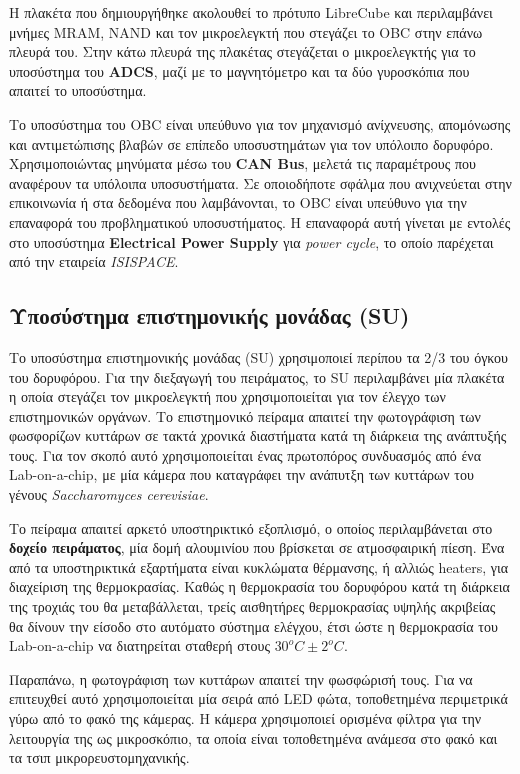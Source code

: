 \documentclass[a4paper,nobib,justified]{tufte-book}
\begin{document}
Η πλακέτα που δημιουργήθηκε ακολουθεί το πρότυπο LibreCube και περιλαμβάνει μνήμες MRAM, NAND και τον μικροελεγκτή που στεγάζει το OBC στην επάνω πλευρά του. Στην κάτω πλευρά της πλακέτας στεγάζεται ο μικροελεγκτής για το υποσύστημα του \textbf{ADCS}, μαζί με το μαγνητόμετρο και τα δύο γυροσκόπια που απαιτεί το υποσύστημα.

Το υποσύστημα του OBC είναι υπεύθυνο για τον μηχανισμό ανίχνευσης, απομόνωσης και αντιμετώπισης βλαβών σε επίπεδο υποσυστημάτων για τον υπόλοιπο δορυφόρο. Χρησιμοποιώντας μηνύματα μέσω του \textbf{CAN Bus}, μελετά τις παραμέτρους που αναφέρουν τα υπόλοιπα υποσυστήματα. Σε οποιοδήποτε σφάλμα που ανιχνεύεται στην επικοινωνία ή στα δεδομένα που λαμβάνονται, το OBC είναι υπεύθυνο για την επαναφορά του προβληματικού υποσυστήματος. Η επαναφορά αυτή γίνεται με εντολές στο υποσύστημα \textbf{Electrical Power Supply} για \emph{power cycle}, το οποίο παρέχεται από την εταιρεία \emph{ISISPACE}.

\subsection{Υποσύστημα επιστημονικής μονάδας (\acs{SU})}

Το υποσύστημα επιστημονικής μονάδας (SU) χρησιμοποιεί περίπου τα 2/3 του όγκου του δορυφόρου. Για την διεξαγωγή του πειράματος, το \acs{SU} περιλαμβάνει μία πλακέτα η οποία στεγάζει τον μικροελεγκτή που χρησιμοποιείται για τον έλεγχο των επιστημονικών οργάνων. Το επιστημονικό πείραμα απαιτεί την φωτογράφιση των φωσφορίζων κυττάρων σε τακτά χρονικά διαστήματα κατά τη διάρκεια της ανάπτυξής τους. Για τον σκοπό αυτό χρησιμοποιείται ένας πρωτοπόρος συνδυασμός από ένα Lab-on-a-chip, με μία κάμερα που καταγράφει την ανάπυτξη των κυττάρων του γένους \textit{Saccharomyces cerevisiae}.

Το πείραμα απαιτεί αρκετό υποστηρικτικό εξοπλισμό, ο οποίος περιλαμβάνεται στο \textbf{δοχείο πειράματος}, μία δομή αλουμινίου που βρίσκεται σε ατμοσφαιρική πίεση. Ένα από τα υποστηρικτικά εξαρτήματα είναι κυκλώματα θέρμανσης, ή αλλιώς heaters, για διαχείριση της θερμοκρασίας. Καθώς η θερμοκρασία του δορυφόρου κατά τη διάρκεια της τροχιάς του θα μεταβάλλεται, τρείς αισθητήρες θερμοκρασίας υψηλής ακριβείας θα δίνουν την είσοδο στο αυτόματο σύστημα ελέγχου, έτσι ώστε η θερμοκρασία του Lab-on-a-chip να διατηρείται σταθερή στους $30^o C \pm 2^oC$. %

Παραπάνω, η φωτογράφιση των κυττάρων απαιτεί την φωσφώρισή τους. Για να επιτευχθεί αυτό χρησιμοποιείται μία σειρά από LED φώτα, τοποθετημένα περιμετρικά γύρω από το φακό της κάμερας. Η κάμερα χρησιμοποιεί ορισμένα φίλτρα για την λειτουργία της ως μικροσκόπιο, τα οποία είναι τοποθετημένα ανάμεσα στο φακό και τα τσιπ μικρορευστομηχανικής.
\end{document}
